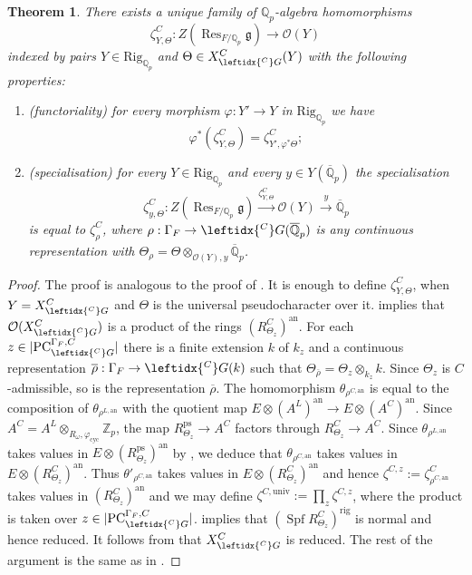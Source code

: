 \documentclass{amsart}
\newtheorem{thm}[prop]{Theorem}
\theoremstyle{definition}
\theoremstyle{remark}
\DeclareMathOperator{\Res}{Res}
\newcommand{\Qp}{\mathbb {Q}_p}
\newcommand{\Zp}{\ZZ_p}
\newcommand{\Qpbar}{\overline{\mathbb{Q}}_p}
\newcommand{\ZZ}{\mathbb Z}
\newcommand{\OO}{\mathcal O}
\newcommand{\ana}{\mathrm{an}}
\newcommand{\rhobar}{\overline{\rho}}
\DeclareMathOperator{\Spf}{Spf}
\newcommand{\rig}{\mathrm{rig}}
\newcommand{\univ}{\mathrm{univ}}
\newcommand{\cyc}{\mathrm{cyc}}
\newcommand{\PC}{\mathrm{PC}}
\newcommand{\ps}{\mathrm{ps}}
\newcommand{\CG}{\leftidx{^C}G{}}
\newcommand{\Rig}{\mathrm{Rig}}
\begin{document}
\begin{thm}\label{main_C} There exists a unique  family of $\Qp$-algebra 
homomorphisms $$\zeta_{Y,\Theta}^C: Z(\Res_{F/\Qp} \mathfrak g)\rightarrow \OO(Y)$$ indexed by pairs $Y\in \Rig_{\Qp}$ and 
$\Theta\in X^{C}_{\CG}(Y)$ with the following properties:
\begin{enumerate} 
\item (functoriality) for every morphism $\varphi: Y'\rightarrow Y$ in $\Rig_{\Qp}$ we have $$\varphi^*(\zeta^C_{Y, \Theta})= \zeta^C_{Y', \varphi^* \Theta};$$
\item (specialisation) for every $Y\in \Rig_{\Qp}$ and every 
$y\in Y(\Qpbar)$ the specialisation 
$$\zeta^C_{y, \Theta}:  Z(\Res_{F/\Qp} \mathfrak g)
\overset{\zeta^C_{Y,\Theta}}{\longrightarrow} \OO(Y)\overset{y}{\longrightarrow} \Qpbar$$
is equal to $\zeta^C_{\rho}$, where $\rho: \Gamma_F \rightarrow 
\CG(\Qpbar)$ is any continuous representation with 
$\Theta_{\rho}= \Theta\otimes_{\OO(Y), y} \Qpbar$. 
\end{enumerate}
\end{thm}
\begin{proof} The proof is analogous to the proof 
of . It is enough to define $\zeta^C_{Y, \Theta}$, when $Y=X^C_{\CG}$ and $\Theta$ is the universal pseudocharacter over it. 
 implies that $\OO(X^{C}_{\CG})$ 
is a product of the rings $(R^C_{\Theta_z})^{\ana}$. For each 
$z\in |\PC^{\Gamma_F,C}_{\CG}|$ there 
is a finite extension $k$ of $k_z$ and
a continuous representation 
$\rhobar: \Gamma_F \rightarrow \CG(k)$ such that $\Theta_{\rhobar}= \Theta_z\otimes_{k_z} k$. Since 
$\Theta_z$ is $C$-admissible, so is the representation $\rhobar$. The homomorphism 
$\theta_{\rho^{C,\ana}}$ is equal to the composition 
of $\theta_{\rho^{L,\ana}}$ with the quotient map 
$E\otimes (A^L)^{\ana}\rightarrow E\otimes (A^C)^{\ana}$. 
Since $A^C= A^L\otimes_{R_{\omega}, \varphi_{\cyc}} \Zp$, the map 
$R^{\ps}_{\Theta_z}\rightarrow A^C$ factors through $R^{C}_{\Theta_z}\rightarrow A^C$.
Since $\theta_{\rho^{L,\ana}}$ takes values in $E\otimes (R^{\ps}_{\Theta_z})^{\ana}$ 
by , we deduce that 
$\theta_{\rho^{C,\ana}}$ takes values 
in $E\otimes (R^C_{\Theta_z})^{\ana}$. 
Thus $\theta'_{\rho^{C, \ana}}$ takes 
values in $E\otimes(R^C_{\Theta_z})^{\ana}$ and hence $\zeta^{C,z}:=\zeta^C_{\rho^{C, \ana}}$ takes values in $(R^C_{\Theta_z})^{\ana}$ and we may 
define $\zeta^{C, \univ}:= \prod_{z} \zeta^{C,z}$, where the product is taken over $z\in |\PC^{\Gamma_F,C}_{\CG}|$.  implies 
that $(\Spf R^C_{\Theta_z})^{\rig}$ is normal and hence reduced. It follows from  that $X^{C}_{\CG}$ is reduced. 
The rest of the argument is the same as in .
\end{proof}
\end{document}
